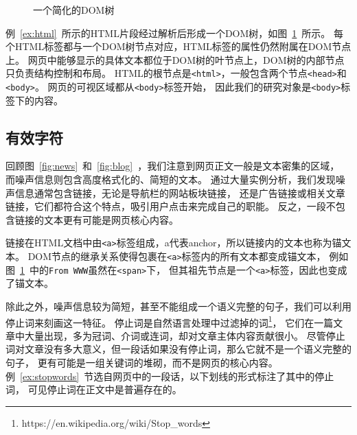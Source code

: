 \begin{figure}[htbp]
\centering
{}
\caption{一个简化的DOM树}
\label{fig:dom}
\end{figure}

例~\ref{ex:html}~所示的HTML片段经过解析后形成一个DOM树，如图~\ref{fig:dom}~所示。
每个HTML标签都与一个DOM树节点对应，HTML标签的属性仍然附属在DOM节点上。
网页中能够显示的具体文本都位于DOM树的叶节点上，DOM树的内部节点只负责结构控制和布局。
HTML的根节点是\texttt{<html>}，一般包含两个节点\texttt{<head>}和\texttt{<body>}。
网页的可视区域都从\texttt{<body>}标签开始，
因此我们的研究对象是\texttt{<body>}标签下的内容。

\subsection{有效字符}
回顾图~\ref{fig:news}~和~\ref{fig:blog}~，我们注意到网页正文一般是文本密集的区域，
而噪声信息则包含高度格式化的、简短的文本。
通过大量实例分析，我们发现噪声信息通常包含链接，无论是导航栏的网站板块链接，
还是广告链接或相关文章链接，它们都符合这个特点，吸引用户点击来完成自己的职能。
反之，一段不包含链接的文本更有可能是网页核心内容。

链接在HTML文档中由\texttt{<a>}标签组成，a代表anchor，所以链接内的文本也称为锚文本。
DOM节点的继承关系使得包裹在\texttt{<a>}标签内的所有文本都变成锚文本，
例如图~\ref{fig:dom}~中的\texttt{From WWW}虽然在\texttt{<span>}下，
但其祖先节点是一个\texttt{<a>}标签，因此也变成了锚文本。

除此之外，噪声信息较为简短，甚至不能组成一个语义完整的句子，我们可以利用停止词来刻画这一特征。
停止词是自然语言处理中过滤掉的词\footnote{https://en.wikipedia.org/wiki/Stop\_words}，
它们在一篇文章中大量出现，多为冠词、介词或连词，却对文章主体内容贡献很小。
尽管停止词对文章没有多大意义，但一段话如果没有停止词，那么它就不是一个语义完整的句子，
更有可能是一组关键词的堆砌，而不是网页的核心内容。
例~\ref{ex:stopwords}~节选自网页中的一段话，以下划线的形式标注了其中的停止词，
可见停止词在正文中是普遍存在的。

